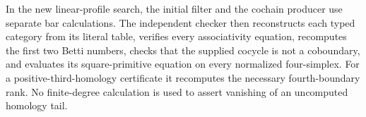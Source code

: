 In the new linear-profile search, the initial filter and the
cochain producer use separate bar calculations. The independent
checker then reconstructs each typed category from its literal
table, verifies every associativity equation, recomputes the
first two Betti numbers, checks that the supplied cocycle is
not a coboundary, and evaluates its square-primitive equation
on every normalized four-simplex. For a positive-third-homology
certificate it recomputes the necessary fourth-boundary rank.
No finite-degree calculation is used to assert vanishing of an
uncomputed homology tail.
